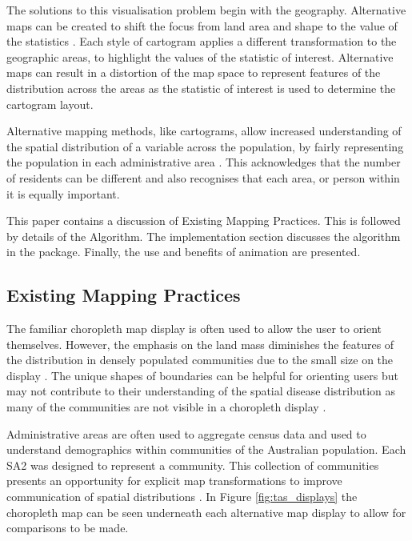 The solutions to this visualisation problem begin with the geography.
Alternative maps can be created to shift the focus from land area and
shape to the value of the statistics \citep{ACCAC}. Each style of
cartogram applies a different transformation to the geographic areas, to
highlight the values of the statistic of interest. Alternative maps can
result in a distortion of the map space to represent features of the
distribution across the areas \citep{ACCAC} as the statistic of interest
is used to determine the cartogram layout.

Alternative mapping methods, like cartograms, allow increased
understanding of the spatial distribution of a variable across the
population, by fairly representing the population in each administrative
area \citep{TAAM}. This acknowledges that the number of residents can be
different and also recognises that each area, or person within it is
equally important.

This paper contains a discussion of Existing Mapping Practices. This is
followed by details of the Algorithm. The implementation section
discusses the algorithm in the  package. Finally, the use
and benefits of animation are presented.

\hypertarget{existing-mapping-practices}{%
\subsection{Existing Mapping
Practices}\label{existing-mapping-practices}}

The familiar choropleth map display is often used to allow the user to
orient themselves. However, the emphasis on the land mass diminishes the
features of the distribution in densely populated communities due to the
small size on the display \citep{ACTUC}. The unique shapes of boundaries
can be helpful for orienting users but may not contribute to their
understanding of the spatial disease distribution as many of the
communities are not visible in a choropleth display \citep{TVSSS}.

Administrative areas are often used to aggregate census data and used to
understand demographics within communities of the Australian population.
Each SA2 \citep{abs2011} was designed to represent a community. This
collection of communities presents an opportunity for explicit map
transformations to improve communication of spatial distributions
\citep{CBATCC}. In Figure \ref{fig:tas_displays} the choropleth map can
be seen underneath each alternative map display to allow for comparisons
to be made.

